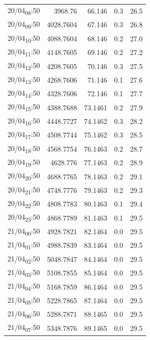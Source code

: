\documentclass[11pt]{article}
\begin{document}
\begin{center}
\begin{tabular}{lrrrr}
20/04\textsubscript{08}:50 & 3968.76 & 66.146 & 0.3 & 26.5\\[0pt]
20/04\textsubscript{09}:50 & 4028.7604 & 67.146 & 0.3 & 26.8\\[0pt]
20/04\textsubscript{10}:50 & 4088.7604 & 68.146 & 0.2 & 27.0\\[0pt]
20/04\textsubscript{11}:50 & 4148.7605 & 69.146 & 0.2 & 27.2\\[0pt]
20/04\textsubscript{12}:50 & 4208.7605 & 70.146 & 0.3 & 27.5\\[0pt]
20/04\textsubscript{13}:50 & 4268.7606 & 71.146 & 0.1 & 27.6\\[0pt]
20/04\textsubscript{14}:50 & 4328.7606 & 72.146 & 0.1 & 27.7\\[0pt]
20/04\textsubscript{15}:50 & 4388.7688 & 73.1461 & 0.2 & 27.9\\[0pt]
20/04\textsubscript{16}:50 & 4448.7727 & 74.1462 & 0.3 & 28.2\\[0pt]
20/04\textsubscript{17}:50 & 4508.7744 & 75.1462 & 0.3 & 28.5\\[0pt]
20/04\textsubscript{18}:50 & 4568.7754 & 76.1463 & 0.2 & 28.7\\[0pt]
20/04\textsubscript{19}:50 & 4628.776 & 77.1463 & 0.2 & 28.9\\[0pt]
20/04\textsubscript{20}:50 & 4688.7765 & 78.1463 & 0.2 & 29.1\\[0pt]
20/04\textsubscript{21}:50 & 4748.7776 & 79.1463 & 0.2 & 29.3\\[0pt]
20/04\textsubscript{22}:50 & 4808.7783 & 80.1463 & 0.1 & 29.4\\[0pt]
20/04\textsubscript{23}:50 & 4868.7789 & 81.1463 & 0.1 & 29.5\\[0pt]
21/04\textsubscript{00}:50 & 4928.7821 & 82.1464 & 0.0 & 29.5\\[0pt]
21/04\textsubscript{01}:50 & 4988.7839 & 83.1464 & 0.0 & 29.5\\[0pt]
21/04\textsubscript{02}:50 & 5048.7847 & 84.1464 & 0.0 & 29.5\\[0pt]
21/04\textsubscript{03}:50 & 5108.7855 & 85.1464 & 0.0 & 29.5\\[0pt]
21/04\textsubscript{04}:50 & 5168.7859 & 86.1464 & 0.0 & 29.5\\[0pt]
21/04\textsubscript{05}:50 & 5228.7865 & 87.1464 & 0.0 & 29.5\\[0pt]
21/04\textsubscript{06}:50 & 5288.7871 & 88.1465 & 0.0 & 29.5\\[0pt]
21/04\textsubscript{07}:50 & 5348.7876 & 89.1465 & 0.0 & 29.5\\[0pt]

\end{tabular}
\end{center}
\end{document}
